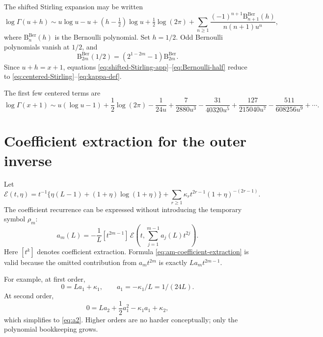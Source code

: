 \documentclass[11pt,oneside]{article}
\theoremstyle{plain}
\theoremstyle{definition}
\theoremstyle{remark}
\newcommand{\Bell}{\mathrm{B}}
\begin{document}
The shifted Stirling expansion may be written
\begin{equation}
 \log\Gamma(u+h)
 \sim u\log u-u+(h-\tfrac12)\log u+\tfrac12\log(2\pi)
 +\sum_{n\ge1}\frac{(-1)^{n+1}\Bell^{\mathrm{Ber}}_{n+1}(h)}
 {n(n+1)u^n},
 \label{eq:shifted-Stirling-app}
\end{equation}
where \(\Bell^{\mathrm{Ber}}_{n}(h)\) is the Bernoulli polynomial.  Set
\(h=1/2\).  Odd Bernoulli polynomials vanish at \(1/2\), and
\begin{equation}
 \Bell^{\mathrm{Ber}}_{2m}(1/2)
 =(2^{1-2m}-1)\Bell^{\mathrm{Ber}}_{2m}.
 \label{eq:Bernoulli-half}
\end{equation}
Since \(u+h=x+1\), equations
\eqref{eq:shifted-Stirling-app}--\eqref{eq:Bernoulli-half} reduce to
\eqref{eq:centered-Stirling}--\eqref{eq:kappa-def}.

The first few centered terms are
\begin{equation}
 \log\Gamma(x+1)
 \sim u(\log u-1)+\frac12\log(2\pi)
 -\frac1{24u}+\frac7{2880u^3}-\frac{31}{40320u^5}
 +\frac{127}{215040u^7}-\frac{511}{608256u^9}+\cdots.
 \label{eq:centered-Stirling-explicit-app}
\end{equation}

\section{Coefficient extraction for the outer inverse}
\label{app:outer-coefficients}

Let
\begin{equation}
 \mathscr{E}(t,\eta)=
 t^{-1}\{\eta(L-1)+(1+\eta)\log(1+\eta)\}
 +\sum_{r\ge1}\kappa_rt^{2r-1}(1+\eta)^{-(2r-1)}.
 \label{eq:E-functional}
\end{equation}
The coefficient recurrence can be expressed without introducing the temporary
symbol \(\rho_m\):
\begin{equation}
 a_m(L)=-\frac1L
 [t^{2m-1}]\,
 \mathscr{E}\!\left(t,\sum_{j=1}^{m-1}a_j(L)t^{2j}\right).
 \label{eq:am-coefficient-extraction}
\end{equation}
Here \([t^k]\) denotes coefficient extraction.  Formula
\eqref{eq:am-coefficient-extraction} is valid because the omitted contribution
from \(a_mt^{2m}\) is exactly \(La_mt^{2m-1}\).

For example, at first order,
\[
 0=La_1+\kappa_1,
 \qquad a_1=-\kappa_1/L=1/(24L).
\]
At second order,
\[
 0=La_2+\frac12a_1^2-\kappa_1a_1+\kappa_2,
\]
which simplifies to \eqref{eq:a2}.  Higher orders are no harder conceptually;
only the polynomial bookkeeping grows.
\end{document}

